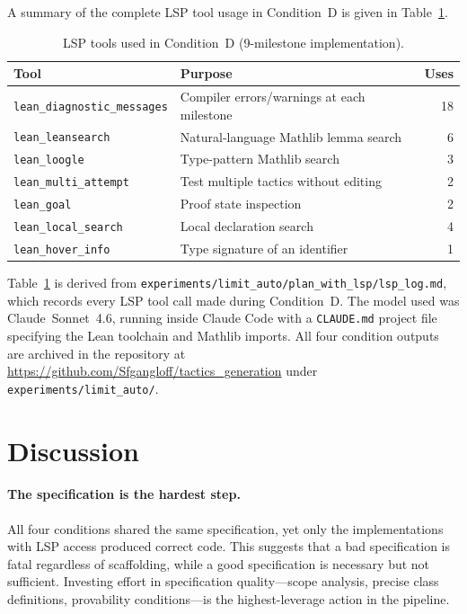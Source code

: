 \documentclass{llncs}
\begin{document}
\bigskip

A summary of the complete LSP tool usage in Condition~D is given in
Table~\ref{tab:lsp}.

\begin{table}[h]
\centering
\caption{LSP tools used in Condition~D (9-milestone implementation).}
\label{tab:lsp}
\begin{tabular}{llr}
\toprule
\textbf{Tool} & \textbf{Purpose} & \textbf{Uses} \\
\midrule
\texttt{lean\_diagnostic\_messages} & Compiler errors/warnings at each milestone & 18 \\
\texttt{lean\_leansearch}           & Natural-language Mathlib lemma search     & 6  \\
\texttt{lean\_loogle}               & Type-pattern Mathlib search               & 3  \\
\texttt{lean\_multi\_attempt}       & Test multiple tactics without editing     & 2  \\
\texttt{lean\_goal}                 & Proof state inspection                    & 2  \\
\texttt{lean\_local\_search}        & Local declaration search                  & 4  \\
\texttt{lean\_hover\_info}          & Type signature of an identifier           & 1  \\
\bottomrule
\end{tabular}
\end{table}

\noindent
Table~\ref{tab:lsp} is derived from \texttt{experiments/limit\_auto/plan\_with\_lsp/lsp\_log.md},
which records every LSP tool call made during Condition~D.
The model used was Claude~Sonnet~4.6, running inside Claude Code
with a \texttt{CLAUDE.md} project file specifying the Lean toolchain and Mathlib imports.
All four condition outputs are archived in the repository at
\url{https://github.com/Sfgangloff/tactics_generation}
under \texttt{experiments/limit\_auto/}.

\section{Discussion}

\paragraph{The specification is the hardest step.}
All four conditions shared the same specification, yet only the implementations
with LSP access produced correct code.  This suggests that a bad specification
is fatal regardless of scaffolding, while a good specification is necessary but
not sufficient.  Investing effort in specification quality---scope analysis,
precise class definitions, provability conditions---is the highest-leverage
action in the pipeline.
\end{document}
